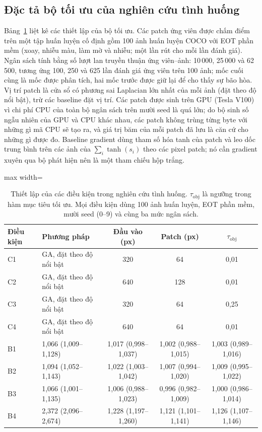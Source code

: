 \documentclass[a4paper,fleqn]{cas-dc}
\begin{document}
\subsection{Đặc tả bộ tối ưu của nghiên cứu tình huống}
Bảng~\ref{tab:spec} liệt kê các thiết lập của bộ tối ưu. Các patch ứng viên được chấm điểm trên một tập huấn luyện cố định gồm 100 ảnh huấn luyện COCO \cite{lin2014coco} với EOT phần mềm (xoay, nhiễu màu, làm mờ và nhiễu; một lần rút cho mỗi lần đánh giá). Ngân sách tính bằng số lượt lan truyền thuận ứng viên--ảnh: 10\,000, 25\,000 và 62\,500, tương ứng 100, 250 và 625 lần đánh giá ứng viên trên 100 ảnh; mốc cuối cùng là mốc được phân tích, hai mốc trước được giữ lại để cho thấy sự bão hòa. Vị trí patch là cửa sổ có phương sai Laplacian lớn nhất của mỗi ảnh (đặt theo độ nổi bật), trừ các baseline đặt vị trí. Các patch được sinh trên GPU (Tesla V100) vì chi phí CPU của toàn bộ ngân sách trên mười seed là quá lớn; do bộ sinh số ngẫu nhiên của GPU và CPU khác nhau, các patch không trùng từng byte với những gì mã CPU sẽ tạo ra, và giá trị băm của mỗi patch đã lưu là căn cứ cho những gì được đo. Baseline gradient dùng tham số hóa tanh của patch và leo dốc trung bình trên các ảnh của $\sum_i \tanh(s_i)$ theo các pixel patch; nó cần gradient xuyên qua bộ phát hiện nên là một tham chiếu hộp trắng.

\begin{table}[!tp]
\centering\small
\caption{Thiết lập của các điều kiện trong nghiên cứu tình huống. $\tau_{\mathrm{obj}}$ là ngưỡng trong hàm mục tiêu tối ưu. Mọi điều kiện dùng 100 ảnh huấn luyện, EOT phần mềm, mười seed (0--9) và cùng ba mức ngân sách.}
\label{tab:spec}
\begin{adjustbox}{max width=\textwidth}
\begin{tabular}{@{}llccc@{}}
\toprule
Điều kiện & Phương pháp & Đầu vào (px) & Patch (px) & $\tau_{\mathrm{obj}}$ \\
\midrule
C1 & GA, đặt theo độ nổi bật & 320 & 64 & 0,01 \\
C2 & GA, đặt theo độ nổi bật & 640 & 128 & 0,01 \\
C3 & GA, đặt theo độ nổi bật & 320 & 64 & 0,25 \\
C4 & GA, đặt theo độ nổi bật & 640 & 64 & 0,01 \\
B1 & 1,066 (1,009--1,128) & 1,017 (0,998--1,037) & 1,002 (0,988--1,015) & 1,003 (0,989--1,016) \\
B2 & 1,094 (1,052--1,143) & 1,022 (1,003--1,042) & 1,007 (0,994--1,020) & 1,009 (0,995--1,022) \\
B3 & 1,066 (1,001--1,135) & 1,006 (0,988--1,023) & 0,996 (0,982--1,009) & 1,000 (0,986--1,014) \\
B4 & 2,372 (2,096--2,674) & 1,228 (1,197--1,260) & 1,121 (1,101--1,141) & 1,126 (1,107--1,146) \\
\bottomrule
\end{tabular}
\end{adjustbox}
\end{table}
\end{document}
